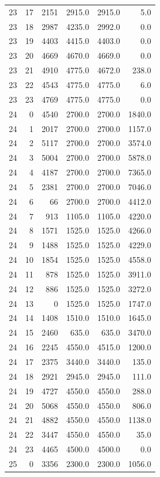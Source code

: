 \begin{longtable}{rrrrrr}
23 & 17 & 2151 & 2915.0 & 2915.0 & 5.0\\
23 & 18 & 2987 & 4235.0 & 2992.0 & 0.0\\
23 & 19 & 4403 & 4415.0 & 4403.0 & 0.0\\
23 & 20 & 4669 & 4670.0 & 4669.0 & 0.0\\
23 & 21 & 4910 & 4775.0 & 4672.0 & 238.0\\
23 & 22 & 4543 & 4775.0 & 4775.0 & 6.0\\
23 & 23 & 4769 & 4775.0 & 4775.0 & 0.0\\
24 & 0 & 4540 & 2700.0 & 2700.0 & 1840.0\\
24 & 1 & 2017 & 2700.0 & 2700.0 & 1157.0\\
24 & 2 & 5117 & 2700.0 & 2700.0 & 3574.0\\
24 & 3 & 5004 & 2700.0 & 2700.0 & 5878.0\\
24 & 4 & 4187 & 2700.0 & 2700.0 & 7365.0\\
24 & 5 & 2381 & 2700.0 & 2700.0 & 7046.0\\
24 & 6 & 66 & 2700.0 & 2700.0 & 4412.0\\
24 & 7 & 913 & 1105.0 & 1105.0 & 4220.0\\
24 & 8 & 1571 & 1525.0 & 1525.0 & 4266.0\\
24 & 9 & 1488 & 1525.0 & 1525.0 & 4229.0\\
24 & 10 & 1854 & 1525.0 & 1525.0 & 4558.0\\
24 & 11 & 878 & 1525.0 & 1525.0 & 3911.0\\
24 & 12 & 886 & 1525.0 & 1525.0 & 3272.0\\
24 & 13 & 0 & 1525.0 & 1525.0 & 1747.0\\
24 & 14 & 1408 & 1510.0 & 1510.0 & 1645.0\\
24 & 15 & 2460 & 635.0 & 635.0 & 3470.0\\
24 & 16 & 2245 & 4550.0 & 4515.0 & 1200.0\\
24 & 17 & 2375 & 3440.0 & 3440.0 & 135.0\\
24 & 18 & 2921 & 2945.0 & 2945.0 & 111.0\\
24 & 19 & 4727 & 4550.0 & 4550.0 & 288.0\\
24 & 20 & 5068 & 4550.0 & 4550.0 & 806.0\\
24 & 21 & 4882 & 4550.0 & 4550.0 & 1138.0\\
24 & 22 & 3447 & 4550.0 & 4550.0 & 35.0\\
24 & 23 & 4465 & 4500.0 & 4500.0 & 0.0\\
25 & 0 & 3356 & 2300.0 & 2300.0 & 1056.0\\

\end{longtable}
